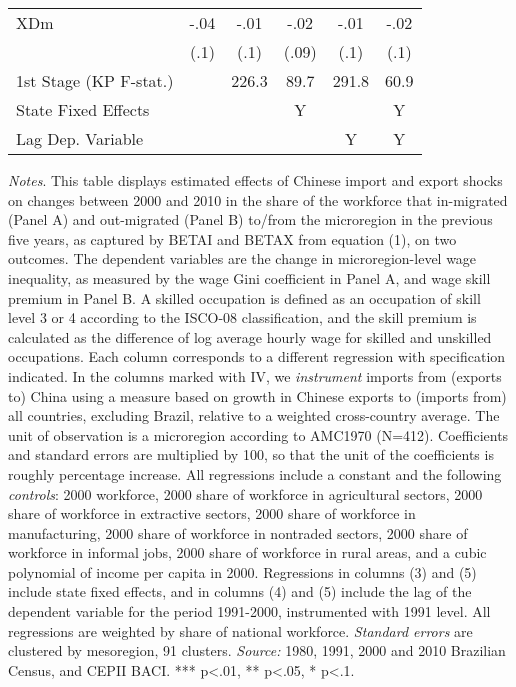 \begin{center}
\begin{table}[h!]
\begin{center}
\begin{centering}
\begin{tabular}{lccccc}
{\footnotesize{}XDm} & {\footnotesize{} -.04} & {\footnotesize{} -.01} & {\footnotesize{} -.02} & {\footnotesize{} -.01} & {\footnotesize{} -.02}\tabularnewline
 & {\scriptsize{}(.1)} & {\scriptsize{}(.1)} & {\scriptsize{}(.09)} & {\scriptsize{}(.1)} & {\scriptsize{}(.1)}\tabularnewline
{\scriptsize{}1st Stage (KP F-stat.)} &  & {\scriptsize{} 226.3} & {\scriptsize{} 89.7} & {\scriptsize{} 291.8} & {\scriptsize{} 60.9}\tabularnewline
\hline 
{\scriptsize{}State Fixed Effects} &  &  & {\scriptsize{}Y} &  & {\scriptsize{}Y}\tabularnewline
{\scriptsize{}Lag Dep. Variable} &  &  &  & {\scriptsize{}Y} & {\scriptsize{}Y}\tabularnewline
\hline 
\end{tabular}
\par\end{centering}
\medskip
\end{center}
\footnotesize
\emph{Notes}. This table displays estimated effects of Chinese import and export shocks on changes between 2000 and 2010 in the share of the workforce that in-migrated (Panel A) and out-migrated (Panel B) to/from the microregion in the previous five years, as captured by BETAI and BETAX from equation (1), on two outcomes. The dependent variables are the change in microregion-level wage inequality, as measured by the wage Gini coefficient in Panel A, and wage skill premium in Panel B. A skilled occupation is defined as an occupation of skill level 3 or 4 according to the ISCO-08 classification, and the skill premium is calculated as the difference of log average hourly wage for skilled and unskilled occupations. Each column corresponds to a different regression with specification indicated. In the columns marked with IV, we \emph{instrument} imports from (exports to) China using a measure based on growth in Chinese exports to (imports from) all countries, excluding Brazil, relative to a weighted cross-country average. The unit of observation is a microregion according to AMC1970 (N=412). Coefficients and standard errors are multiplied by 100, so that the unit of the coefficients is roughly percentage increase. All regressions include a constant and the following \emph{controls}: 2000 workforce, 2000 share of workforce in agricultural sectors, 2000 share of workforce in extractive sectors, 2000 share of workforce in manufacturing, 2000 share of workforce in nontraded sectors, 2000 share of workforce in informal jobs, 2000 share of workforce in rural areas, and a cubic polynomial of income per capita in 2000. Regressions in columns (3) and (5) include state fixed effects, and in columns (4) and (5) include the lag of the dependent variable for the period 1991-2000, instrumented with 1991 level. All regressions are weighted by share of national workforce.
 \emph{Standard errors} are clustered by mesoregion, 91 clusters. \emph{Source:} 1980, 1991, 2000 and 2010 Brazilian Census, and CEPII BACI. *** p<.01, ** p<.05, * p<.1.
\end{table}
\par \end{center}
